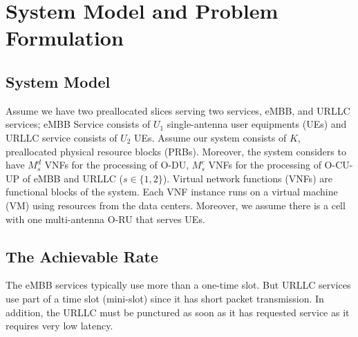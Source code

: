 \documentclass[conference]{IEEEtran}
\begin{document}
\section{System Model and Problem Formulation}
\subsection{System Model}
Assume we have two preallocated slices serving two services, eMBB, and URLLC services; 
eMBB Service consists of $U_{1}$ single-antenna user equipments (UEs) and URLLC service consists of $U_2$ UEs.
Assume our system consists of $K$, preallocated physical resource blocks (PRBs). Moreover, the system considers to have $M_s^{d}$ VNFs for the processing of O-DU, $M_s^{c}$ VNFs for the processing of O-CU-UP of eMBB and URLLC ($ s \in \{1, 2\}$). 
Virtual network functions (VNFs) are functional blocks of the system. Each VNF instance runs on a virtual machine (VM) using resources from the data centers. 
Moreover, we assume there is a cell with one multi-antenna O-RU that serves UEs.
\subsection{The Achievable Rate}
The eMBB services typically use more than a one-time slot. But URLLC services use part of a time slot (mini-slot) since it has short packet transmission. In addition, the URLLC must be punctured as soon as it has requested service as it requires very low latency.
\end{document}
